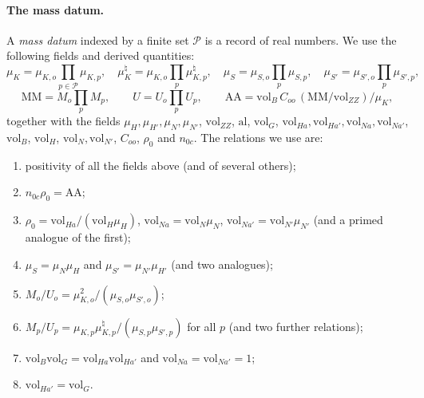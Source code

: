 \paragraph{The mass datum.} A \emph{mass datum} indexed by a finite set $\mathcal P$ is a record of real numbers. We use the
following fields and derived quantities:
\[
\mu_K=\mu_{K,o}\prod_{p\in\mathcal P}\mu_{K,p},\quad \mu_K^\natural=\mu_{K,o}\prod_p\mu^\natural_{K,p},\quad
\mu_S=\mu_{S,o}\prod_p\mu_{S,p},\quad\mu_{S'}=\mu_{S',o}\prod_p\mu_{S',p},
\]
\[
\mathrm{MM}=M_o\prod_pM_p,\qquad U=U_o\prod_pU_p,\qquad \mathrm{AA}=\mathrm{vol}_B\,C_{oo}\,(\mathrm{MM}/\mathrm{vol}_{ZZ})/\mu_K,
\]
together with the fields $\mu_H,\mu_{H'},\mu_N,\mu_{N'}$, $\mathrm{vol}_{ZZ}$, $\mathrm{al}$, $\mathrm{vol}_G$,
$\mathrm{vol}_{Ha},\mathrm{vol}_{Ha'},\mathrm{vol}_{Na},\mathrm{vol}_{Na'}$, $\mathrm{vol}_B$, $\mathrm{vol}_H$,
$\mathrm{vol}_N,\mathrm{vol}_{N'}$, $C_{oo}$, $\rho_0$ and $n_{0c}$. The relations we use are:
\begin{enumerate}[label=(R\arabic*),start=0]
\item positivity of all the fields above (and of several others);
\item $n_{0c}\rho_0=\mathrm{AA}$;
\item $\rho_0=\mathrm{vol}_{Ha}/(\mathrm{vol}_H\mu_H)$, $\mathrm{vol}_{Na}=\mathrm{vol}_N\mu_N$,
$\mathrm{vol}_{Na'}=\mathrm{vol}_{N'}\mu_{N'}$ (and a primed analogue of the first);
\item $\mu_S=\mu_N\mu_H$ and $\mu_{S'}=\mu_{N'}\mu_{H'}$ (and two analogues);
\item $M_o/U_o=\mu_{K,o}^2/(\mu_{S,o}\mu_{S',o})$;
\item $M_p/U_p=\mu_{K,p}\mu^\natural_{K,p}/(\mu_{S,p}\mu_{S',p})$ for all $p$ (and two further relations);
\item $\mathrm{vol}_B\mathrm{vol}_G=\mathrm{vol}_{Ha}\mathrm{vol}_{Ha'}$ and $\mathrm{vol}_{Na}=\mathrm{vol}_{Na'}=1$;
\item $\mathrm{vol}_{Ha'}=\mathrm{vol}_G$.
\end{enumerate}

